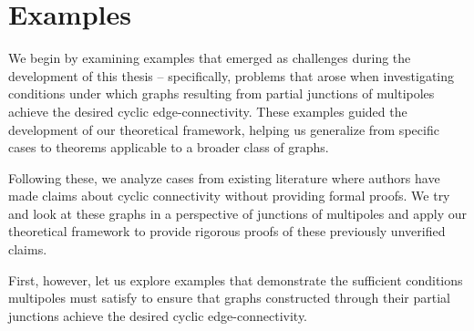 \documentclass[12pt, twoside]{book}
\begin{document}
\section{Examples}\label{sec:examples}

We begin by examining examples that emerged as challenges during the development of this thesis -- specifically, problems that arose when investigating conditions under which graphs resulting from partial junctions of multipoles achieve the desired cyclic edge-connectivity. These examples guided the development of our theoretical framework, helping us generalize from specific cases to theorems applicable to a broader class of graphs.

Following these, we analyze cases from existing literature where authors have made claims about cyclic connectivity without providing formal proofs. We try and look at these graphs in a perspective of junctions of multipoles and apply our theoretical framework to provide rigorous proofs of these previously unverified claims.

First, however, let us explore examples that demonstrate the sufficient conditions multipoles must satisfy to ensure that graphs constructed through their partial junctions achieve the desired cyclic edge-connectivity.
\end{document}
